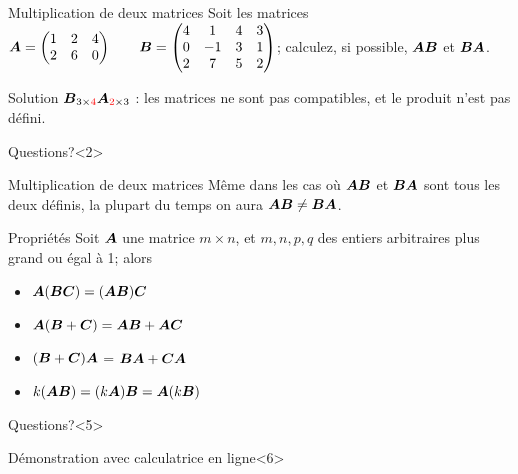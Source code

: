 \documentclass[french, handout]{beamer}
\begin{document}
\begin{frame}{Multiplication de deux matrices}
Soit les matrices
$\displaystyle
\boldsymbol{A} = \begin{pmatrix}
	1 & 2 & 4 \\
	2 & 6 & 0
	\end{pmatrix}
\qquad
\boldsymbol{B} = \begin{pmatrix}
	4 & 1 & 4 & 3\\
	0 & -1 & 3 & 1 \\
	2 & 7 & 5 & 2
	\end{pmatrix}
$;
calculez, si possible, $\boldsymbol{A}\boldsymbol{B}$ et $\boldsymbol{B}\boldsymbol{A}$.

\begin{block}{Solution}
$
\boldsymbol{B}_{3\times \textcolor{red}{4}}\boldsymbol{A}_{\textcolor{red}{2}\times3}$ : les matrices ne sont 
pas compatibles, et le produit n'est pas défini.
\end{block}
\begin{block}{Questions?}<2>
\end{block}
\end{frame}

\begin{frame}{Multiplication de deux matrices}
Même dans les cas où $\boldsymbol{A}\boldsymbol{B}$ et $\boldsymbol{B}\boldsymbol{A}$ sont tous les deux définis, la plupart du temps on aura
$\boldsymbol{A}\boldsymbol{B} \neq \boldsymbol{B}\boldsymbol{A}$.
\end{frame}

\begin{frame}{Propriétés}
Soit $\boldsymbol{A}$ une matrice $m \times n$, et $m, n, p, q$ des entiers arbitraires plus grand ou égal à 1; alors
\begin{itemize}[<+-|alert@+>]
\item $\boldsymbol{A}(\boldsymbol{B}\boldsymbol{C}) = (\boldsymbol{A}\boldsymbol{B})\boldsymbol{C}$ 
\item $\boldsymbol{A}(\boldsymbol{B}+\boldsymbol{C}) = \boldsymbol{A}\boldsymbol{B} + \boldsymbol{A}\boldsymbol{C}$ 
\item $(\boldsymbol{B}+\boldsymbol{C})\boldsymbol{A}$ = $\boldsymbol{B}\boldsymbol{A} + \boldsymbol{C}\boldsymbol{A}$ 
\item $k(\boldsymbol{A}\boldsymbol{B}) = (k\boldsymbol{A})\boldsymbol{B} = \boldsymbol{A}(k\boldsymbol{B})$ 
\end{itemize}
\begin{block}{Questions?}<5>
\end{block}
\begin{block}{Démonstration avec calculatrice en ligne}<6>
\end{block}
\end{frame}
\end{document}
